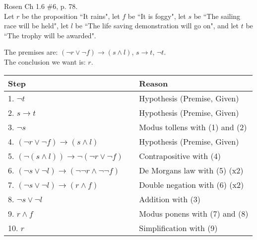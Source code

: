 \documentclass[10pt,addpoints]{exam}
\begin{document}
\begin{questions}
\begin{solution}
\begin{itemize}[itemsep=0pt,parsep=0pt,topsep=0pt,partopsep=0pt]
        \end{itemize}
\end{solution}



\question[6] Rosen Ch 1.6 \#6, p. 78.\\
Let $r$ be the proposition ``It rains", let $f$ be ``It is foggy",
    let $s$ be ``The sailing race will be held", let $l$ be ``The life
    saving demonstration will go on", and let $t$ be ``The trophy will
    be awarded".
    \ifprintanswers
        \vspace{-10pt}
    \fi
\begin{solution}
    The premises are: $(\neg r \vee \neg f) \rightarrow (s \wedge l)$, $s \rightarrow t$, $\neg t$. \\
    The conclusion we want is: $r$.

    \begin{tabular}{lll}
        Step    & \hspace{0.2in} & Reason \\
        \hline
        1. $\neg t$                 &       & Hypothesis (Premise, Given) \\
        2. $s \rightarrow t$        &       & Hypothesis (Premise, Given) \\
        3. $\neg s$                 &       & Modus tollens with (1) and (2) \\
        4. $(\neg r \vee \neg f) \rightarrow (s \wedge l)$  &   & Hypothesis (Premise, Given)  \\
        5. $(\neg(s \wedge l)) \rightarrow \neg(\neg r \vee \neg f)$    & & Contrapositive with (4) \\
        6. $(\neg s \vee \neg l) \rightarrow (\neg \neg r \wedge \neg \neg f)$ & & De Morgans law with (5) (x2) \\
        7. $(\neg s \vee \neg l) \rightarrow (r \wedge f)$  & & Double negation with (6) (x2) \\
        8. $\neg s \vee \neg l$     &       & Addition with (3) \\
        9. $r \wedge f$             &       & Modus ponens with (7) and (8) \\
        10. $r$                     &       & Simplification with (9)
    \end{tabular}


\end{solution}
\end{questions}
\end{document}
